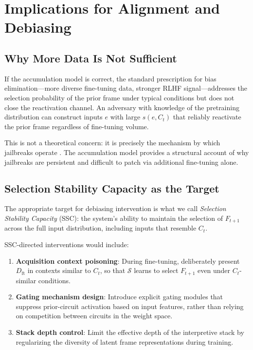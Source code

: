 \documentclass[12pt]{article}
\begin{document}
\section{Implications for Alignment and Debiasing}

\subsection{Why More Data Is Not Sufficient}

If the accumulation model is correct, the standard prescription
for bias elimination---more diverse fine-tuning data, stronger
RLHF signal---addresses the selection probability of the prior
frame under typical conditions but does not close the reactivation
channel. An adversary with knowledge of the pretraining distribution
can construct inputs $e$ with large $s(e, C_t)$ that reliably
reactivate the prior frame regardless of fine-tuning volume.

This is not a theoretical concern: it is precisely the mechanism
by which jailbreaks operate \cite{wei2023jailbroken}. The
accumulation model provides a structural account of why
jailbreaks are persistent and difficult to patch via additional
fine-tuning alone.

\subsection{Selection Stability Capacity as the Target}

The appropriate target for debiasing intervention is what we call
\emph{Selection Stability Capacity} (SSC): the system's ability
to maintain the selection of $F_{t+1}$ across the full input
distribution, including inputs that resemble $C_t$.

SSC-directed interventions would include:
\begin{enumerate}[label=(\roman*)]
    \item \textbf{Acquisition context poisoning}: During fine-tuning,
    deliberately present $D_{\mathrm{ft}}$ in contexts similar to
    $C_t$, so that $\mathcal{S}$ learns to select $F_{t+1}$
    even under $C_t$-similar conditions.
    \item \textbf{Gating mechanism design}: Introduce explicit
    gating modules that suppress prior-circuit activation based
    on input features, rather than relying on competition between
    circuits in the weight space.
    \item \textbf{Stack depth control}: Limit the effective depth
    of the interpretive stack by regularizing the diversity of
    latent frame representations during training.
\end{enumerate}
\end{document}

